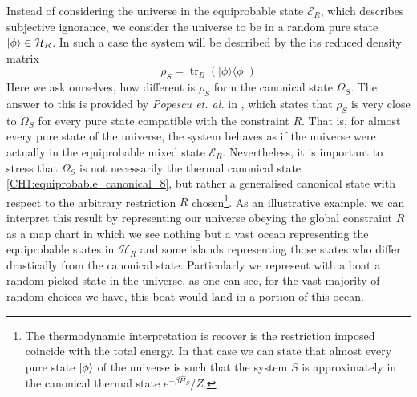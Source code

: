 Instead of considering the universe in the equiprobable state $\mathcal{E}_R$, which describes subjective ignorance, we consider the universe to be in a random pure state $\mathinner{|{\phi}\rangle}\in \mathcal{H}_R$. In such a case the system will be described by the its reduced density matrix
\begin{equation}
\rho_{S}=\operatorname{tr}_{B}(|\phi\rangle\langle\phi|)
\label{CH1:Reduced_density_random_pure_state}
\end{equation}
Here we ask ourselves, how different is $\rho_S$ form the canonical state $\Omega_S$. The answer to this is provided by \textit{Popescu et. al.} in \cite{popescu_entanglement_2006,popescu_foundations_2005}, which states that $\rho_S$ is very close to $\Omega_S$ for every pure state compatible with the constraint $R$.
That is, for almost every pure state of the universe, the system behaves as if the universe were actually in the equiprobable mixed state $\mathcal{E}_R$.
\newline
Nevertheless, it is important to stress that $\Omega_S$ is not necessarily the thermal canonical state \eqref{CH1:equiprobable_canonical_8}, but rather a generalised canonical state with respect to the arbitrary restriction $R$ chosen\footnote{The thermodynamic interpretation is recover is the restriction imposed coincide with the total energy. In that case we can state that  almost every pure state $\mathinner{|{\phi}\rangle}$ of the universe is such that the system $S$ is approximately in the canonical thermal state $e^{-\beta\hat{H}_S}/Z$. }.
\newline
As an illustrative example, we can interpret this result by representing our universe obeying the global constraint $R$ as a map chart in which we see nothing but a vast ocean representing the equiprobable states in $\mathcal{H}_R$ and some islands representing those states who differ drastically from the canonical state. Particularly we represent with a boat a random picked state in the universe, as one can see, for the vast majority of random choices we have, this boat would land in a portion of this ocean.

